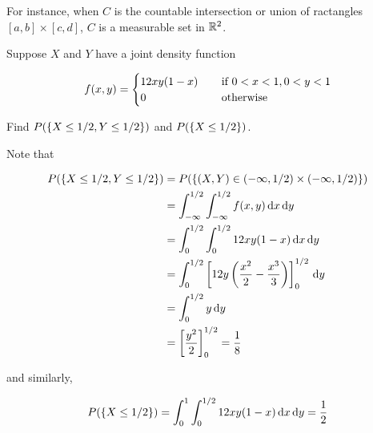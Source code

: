 \documentclass[a4paper,12pt]{article}
\begin{document}
For instance, when $C$ is the countable intersection or union of ractangles $[a,b]\times[c,d]$, $C$ is a measurable set in $\mathbb{R}^{2}$.\n

\begin{exm}
  Suppose $X$ and $Y$ have a joint density function

  $$f(x,y)=\begin{cases}
    12xy(1-x)&\;\;\;\;\text{if }0<x<1,0<y<1\\
    0&\;\;\;\;\text{otherwise}
  \end{cases}$$\s

  Find $P(\left\{ X\leq 1/2,Y\leq 1/2\right\})$ and $P(\left\{ X\leq 1/2\right\})$.\n

  \ans Note that

  $$\begin{aligned}[t]
    P(\left\{ X\leq 1/2,Y\leq 1/2\right\})&=P(\left\{ (X,Y)\in(-\infty,1/2)\times(-\infty,1/2)\right\})\\
    &=\int_{-\infty}^{1/2}\int_{-\infty}^{1/2}f(x,y)\,\mathrm{d} x\,\mathrm{d} y\\
    &=\int_{0}^{1/2}\int_{0}^{1/2}12xy(1-x)\,\mathrm{d} x\,\mathrm{d} y\\
    &=\int_{0}^{1/2}\left[ 12y\left( \frac{x^{2}}{2}-\frac{x^{3}}{3}\right)\right]_{0}^{1/2}\,\mathrm{d} y\\
    &=\int_{0}^{1/2}y\,\mathrm{d} y\\
    &=\left[ \frac{y^{2}}{2}\right]_{0}^{1/2}=\frac{1}{8}
  \end{aligned}$$\s

   and similarly,

   $$P(\left\{ X\leq 1/2\right\})=\int_{0}^{1}\int_{0}^{1/2}12xy(1-x)\,\mathrm{d} x\,\mathrm{d} y=\frac{1}{2}$$
\end{exm}\n
\end{document}
